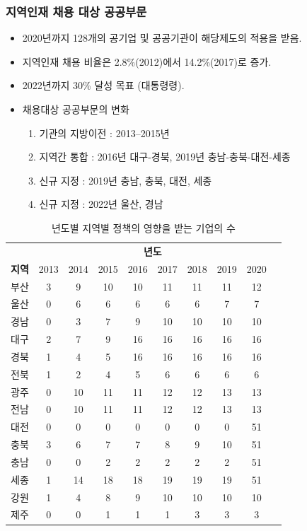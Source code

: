 \documentclass[aspectratio=169,xcolor=dvipsnames,handout]{beamer}
\begin{document}
\begin{frame}[allowframebreaks]
    \frametitle{지역인재 채용 대상 공공부문}
    \begin{itemize}[<+->]
        \item 2020년까지 128개의 공기업 및 공공기관이 해당제도의 적용을 받음. 
        \item 지역인재 채용 비율은 2.8\%(2012)에서 14.2\%(2017)로 증가.
        \item 2022년까지 30\% 달성 목표 (대통령령).
        \item 채용대상 공공부문의 변화
        \begin{enumerate}
            \item 기관의 지방이전 : 2013--2015년
            \item 지역간 통합 : 2016년 대구-경북, 2019년 충남-충북-대전-세종
            \item 신규 지정 : 2019년 충남, 충북, 대전, 세종
            \item 신규 지정 : 2022년 울산, 경남
        \end{enumerate}
    \end{itemize}
    \begin{table}[ht]
        \centering
        \tiny
        \begin{tabular}{lccccccccc}
        \toprule
        & \multicolumn{8}{c}{\textbf{년도}} \\
        \cline{2-9} 
        \textbf{지역} & 2013 & 2014 & 2015 & 2016 & 2017 & 2018 & 2019 & 2020 \\
        \midrule
        부산     & 3 & 9  & 10 & 10 & 11 & 11 & 11 & 12 \\
        울산     & 0 & 6  & 6  & 6  & 6  & 6  & 7  & 7  \\
        경남 & 0 & 3  & 7  & 9  & 10 & 10 & 10 & 10 \\
        대구     & 2 & 7  & 9  & 16 & 16 & 16 & 16 & 16 \\
        경북  & 1 & 4  & 5  & 16 & 16 & 16 & 16 & 16 \\
        전북   & 1 & 2  & 4  & 5  & 6  & 6  & 6  & 6  \\
        광주   & 0 & 10 & 11 & 11 & 12 & 12 & 13 & 13 \\
        전남    & 0 & 10 & 11 & 11 & 12 & 12 & 13 & 13 \\
        대전    & 0 & 0  & 0  & 0  & 0  & 0  & 0  & 51 \\
        충북  & 3 & 6  & 7  & 7  & 8  & 9  & 10 & 51 \\
        충남 & 0 & 0  & 2  & 2  & 2  & 2  & 2  & 51 \\
        세종    & 1 & 14 & 18 & 18 & 19 & 19 & 19 & 51 \\
        강원   & 1 & 4  & 8  & 9  & 10 & 10 & 10 & 10 \\
        제주      & 0 & 0  & 1  & 1  & 1  & 3  & 3  & 3  \\
        \bottomrule
        \end{tabular}
        \caption{년도별 지역별 정책의 영향을 받는 기업의 수}
    \end{table}
\end{frame}
\end{document}
